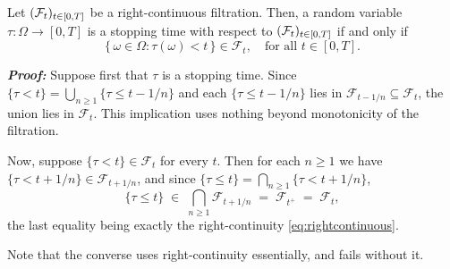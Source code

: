 
\begin{proposition}\label{prop:stoppingtimechar}
 Let \((\mathcal{F}_t)_{t\in[0,T]}\) be a right-continuous filtration. Then, a random variable \(\tau : \Omega \to [0, T]\) is a stopping time with respect to \((\mathcal{F}_t)_{t\in[0,T]}\) if and only if  
\[
\{ \, \omega \in \Omega : \tau(\omega) < t \, \} \in \mathcal{F}_t, 
\quad \text{for all } t \in [0, T].
\]
\end{proposition}

\textbf{\textit{Proof:}} Suppose first that $\tau$ is a stopping time. Since
$\{\tau < t\} = \bigcup_{n \geq 1}\{\tau \leq t - 1/n\}$ and each $\{\tau \leq t-1/n\}$ lies in
$\mathcal{F}_{t-1/n} \subseteq \mathcal{F}_t$, the union lies in $\mathcal{F}_t$. This implication
uses nothing beyond monotonicity of the filtration.

Now, suppose $\{\tau < t\} \in \mathcal{F}_t$ for every $t$. Then for each $n \geq 1$ we have
$\{\tau < t + 1/n\} \in \mathcal{F}_{t+1/n}$, and since $\{\tau \leq t\} = \bigcap_{n\geq1}\{\tau < t + 1/n\}$,
\[
\{\tau \leq t\} \;\in\; \bigcap_{n \geq 1}\mathcal{F}_{t+1/n} \;=\; \mathcal{F}_{t^+} \;=\; \mathcal{F}_t,
\]
the last equality being exactly the right-continuity \eqref{eq:rightcontinuous}. \qedfilledtext

\medskip

Note that the converse uses right-continuity essentially, and fails without it.


